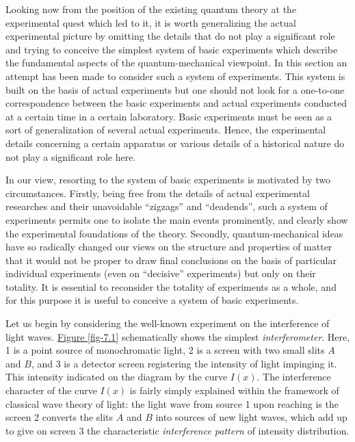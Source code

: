 \documentclass[a4paper,sfsidenotes,colorlinks=true]{tufte-book}
\numberwithin{equation}{section}
\numberwithin{figure}{section}
\begin{document}
Looking now from the position of the existing quantum theory at the experimental quest which led to it, it is worth generalizing the actual experimental picture by omitting the details that do not play a significant role and trying to conceive the simplest system of basic experiments which describe the fundamental aspects of the quantum-mechanical viewpoint. In this section an attempt has been made to consider such a system of experiments. This system is built on the basis of actual experiments but one should not look for a one-to-one correspondence between the basic experiments and actual experiments conducted at a certain time in a certain laboratory. Basic experiments must be seen as a sort of generalization of several actual experiments. Hence, the experimental details concerning a certain apparatus or various details of a historical nature do not play a significant role here. 

In our view, resorting to the system of basic experiments is motivated by two circumstances. Firstly, being free
from the details of actual experimental researches and their unavoidable ``zigzags'' and ``deadends'', such a system of experiments permits one to isolate the main events prominently, and clearly show the experimental foundations of the theory. Secondly, quantum-mechanical ideas have so radically changed our views on the structure and properties of matter that it would not be proper to draw final conclusions on the basis of particular individual experiments (even on ``decisive'' experiments) but only on their totality. It is essential to reconsider the totality of experiments as a whole, and for this purpose it is useful to conceive a system of basic experiments. 


Let us begin by considering the well-known experiment on the interference of light waves. \hyperref[fig-7.1]{Figure \ref{fig-7.1}} schematically shows the simplest \emph{interferometer}. Here, \textsf{1} is a point source of monochromatic light, \textsf{2} is a screen with two small slits $A$ and $B$, and \textsf{3} is a detector screen registering the intensity of light impinging it. This intensity indicated on the diagram by the curve $I(x)$. The interference character of the curve $I(x)$ is fairly simply
explained within the framework of classical wave theory of light:  the light wave from source \textsf{1} upon reaching is the screen \textsf{2} converts the slits $A$ and $B$ into sources of new light waves, which add up to give on screen \textsf{3} the characteristic \emph{interference pattern} of intensity distribution.
\end{document}
